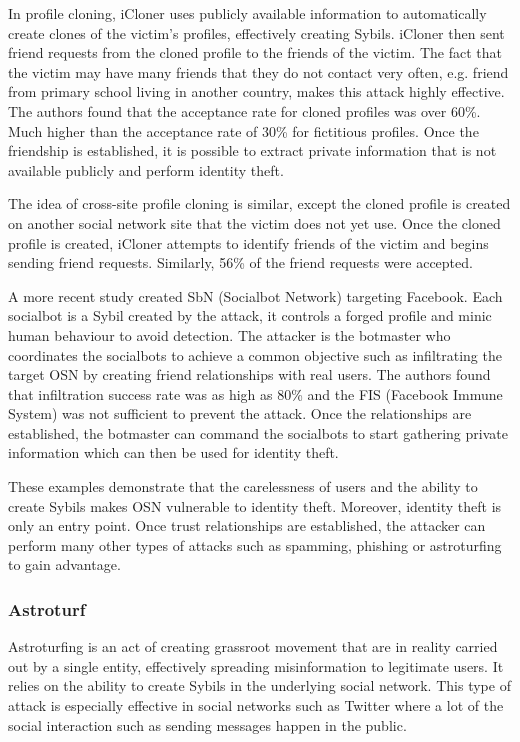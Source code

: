 In profile cloning, iCloner uses publicly available information to automatically
create clones of the victim's profiles, effectively creating Sybils. iCloner
then sent friend requests from the cloned profile to the friends of the victim.
The fact that the victim may have many friends that they do not contact very
often, e.g. friend from primary school living in another country, makes this
attack highly effective. The authors found that the acceptance rate for cloned
profiles was over 60\%. Much higher than the acceptance rate of 30\% for
fictitious profiles. Once the friendship is established, it is possible to
extract private information that is not available publicly and perform identity
theft.

The idea of cross-site profile cloning is similar, except the cloned profile is
created on another social network site that the victim does not yet use. Once
the cloned profile is created, iCloner attempts to identify friends of the
victim and begins sending friend requests. Similarly, 56\% of the friend
requests were accepted. 

A more recent study created SbN (Socialbot Network) targeting
Facebook\cite{boshmaf2011socialbot}. Each socialbot is a Sybil created by the
attack, it controls a forged profile and minic human behaviour to avoid
detection. The attacker is the botmaster who coordinates the socialbots to
achieve a common objective such as infiltrating the target OSN by creating
friend relationships with real users. The authors found that infiltration
success rate was as high as 80\% and the FIS\cite{stein2011facebook} (Facebook
Immune System) was not sufficient to prevent the attack. Once the relationships
are established, the botmaster can command the socialbots to start gathering
private information which can then be used for identity theft.


These examples demonstrate that the carelessness of users and the ability to
create Sybils makes OSN vulnerable to identity theft. Moreover, identity theft
is only an entry point. Once trust relationships are established, the attacker
can perform many other types of attacks such as spamming, phishing or
astroturfing to gain advantage.

\subsubsection{Astroturf}
Astroturfing is an act of creating grassroot movement that are in reality
carried out by a single entity, effectively spreading misinformation to
legitimate users. It relies on the ability to create Sybils in the underlying
social network. This type of attack is especially effective in social networks
such as Twitter where a lot of the social interaction such as sending messages
happen in the public.

